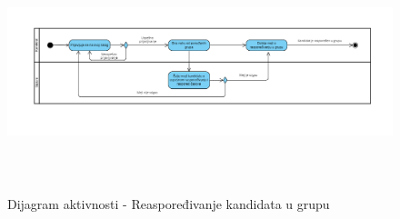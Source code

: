\begin{figure}[H]
  \begin{center}
      \includegraphics[width=140mm, height=70mm]{Diagrams/dijagram_aktivnosti_grupe.png}
  \end{center}
  \caption {Dijagram aktivnosti - Reaspoređivanje kandidata u grupu}
  \label{activity_grupe}

\end{figure}